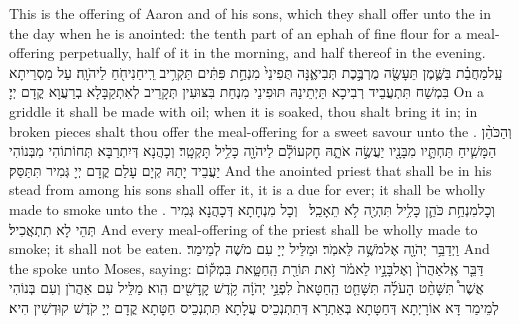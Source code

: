 {This is the offering of Aaron and of his sons, which they shall offer unto the \lord\space in the day when he is anointed: the tenth part of an ephah of fine flour for a meal-offering perpetually, half of it in the morning, and half thereof in the evening.}{}
{עַֽל\maqqaf מַחֲבַ֗ת בַּשֶּׁ֛מֶן תֵּעָשֶׂ֖ה מֻרְבֶּ֣כֶת תְּבִיאֶ֑נָּה תֻּפִינֵי֙ מִנְחַ֣ת פִּתִּ֔ים תַּקְרִ֥יב רֵֽיחַ\maqqaf נִיחֹ֖חַ לַיהֹוָֽה׃}
{עַל מַסְרֵיתָא בִּמְשַׁח תִּתְעֲבֵיד רְבִיכָא תַּיְתֵינַהּ תּוּפִינֵי מִנְחַת בִּצּוּעִין תְּקָרֵיב לְאִתְקַבָּלָא בְרַעֲוָא קֳדָם יְיָ׃}
{On a griddle it shall be made with oil; when it is soaked, thou shalt bring it in; in broken pieces shalt thou offer the meal-offering for a sweet savour unto the \lord.}{}
{וְהַכֹּהֵ֨ן הַמָּשִׁ֧יחַ תַּחְתָּ֛יו מִבָּנָ֖יו יַעֲשֶׂ֣ה אֹתָ֑הּ חׇק\maqqaf עוֹלָ֕ם לַיהֹוָ֖ה כָּלִ֥יל תׇּקְטָֽר׃}
{וְכָהֲנָא דְּיִתְרַבָּא תְּחוֹתוֹהִי מִבְּנוֹהִי יַעֲבֵיד יָתַהּ קְיָם עָלַם קֳדָם יְיָ גְּמִיר תִּתַּסַּק׃}
{And the anointed priest that shall be in his stead from among his sons shall offer it, it is a due for ever; it shall be wholly made to smoke unto the \lord.}{}
{וְכׇל\maqqaf מִנְחַ֥ת כֹּהֵ֛ן כָּלִ֥יל תִּהְיֶ֖ה לֹ֥א תֵאָכֵֽל׃ \petucha }
{וְכָל מִנְחָתָא דְּכָהֲנָא גְּמִיר תְּהֵי לָא תִתְאֲכִיל׃}
{And every meal-offering of the priest shall be wholly made to smoke; it shall not be eaten.}{}
{וַיְדַבֵּ֥ר יְהֹוָ֖ה אֶל\maqqaf מֹשֶׁ֥ה לֵּאמֹֽר׃}
{וּמַלֵּיל יְיָ עִם מֹשֶׁה לְמֵימַר׃}
{And the \lord\space spoke unto Moses, saying:}{}
{דַּבֵּ֤ר אֶֽל\maqqaf אַהֲרֹן֙ וְאֶל\maqqaf בָּנָ֣יו לֵאמֹ֔ר זֹ֥את תּוֹרַ֖ת הַֽחַטָּ֑את בִּמְק֡וֹם אֲשֶׁר֩ תִּשָּׁחֵ֨ט הָעֹלָ֜ה תִּשָּׁחֵ֤ט הַֽחַטָּאת֙ לִפְנֵ֣י יְהֹוָ֔ה קֹ֥דֶשׁ קׇֽדָשִׁ֖ים הִֽוא׃}
{מַלֵּיל עִם אַהֲרֹן וְעִם בְּנוֹהִי לְמֵימַר דָּא אוֹרָיְתָא דְּחַטָּתָא בְּאַתְרָא דְּתִתְנְכֵיס עֲלָתָא תִּתְנְכֵיס חַטָּתָא קֳדָם יְיָ קֹדֶשׁ קוּדְשִׁין הִיא׃}
